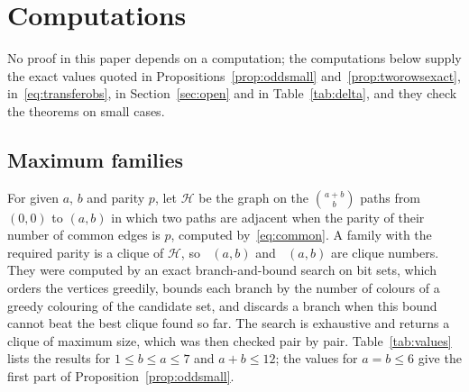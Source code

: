 \documentclass[11pt]{amsart}
\theoremstyle{definition}
\theoremstyle{remark}
\numberwithin{equation}{section}
\DeclareMathOperator{\Meven}{M_{ev}}
\DeclareMathOperator{\Modd}{M_{od}}
\begin{document}
\appendix

\section{Computations}\label{app:comp}

No proof in this paper depends on a computation; the computations below supply the exact values quoted in Propositions~\ref{prop:oddsmall} and~\ref{prop:tworowsexact}, in~\eqref{eq:transferobs}, in Section~\ref{sec:open} and in Table~\ref{tab:delta}, and they check the theorems on small cases.

\subsection*{Maximum families}
For given $a$, $b$ and parity $p$, let $\mathcal{H}$ be the graph on the $\binom{a+b}{b}$ paths from $(0,0)$ to $(a,b)$ in which two paths are adjacent when the parity of their number of common edges is $p$, computed by~\eqref{eq:common}. A family with the required parity is a clique of $\mathcal H$, so $\Meven(a,b)$ and $\Modd(a,b)$ are clique numbers. They were computed by an exact branch-and-bound search on bit sets, which orders the vertices greedily, bounds each branch by the number of colours of a greedy colouring of the candidate set, and discards a branch when this bound cannot beat the best clique found so far. The search is exhaustive and returns a clique of maximum size, which was then checked pair by pair. Table~\ref{tab:values} lists the results for $1\le b\le a\le 7$ and $a+b\le12$; the values for $a=b\le6$ give the first part of Proposition~\ref{prop:oddsmall}.
\end{document}
